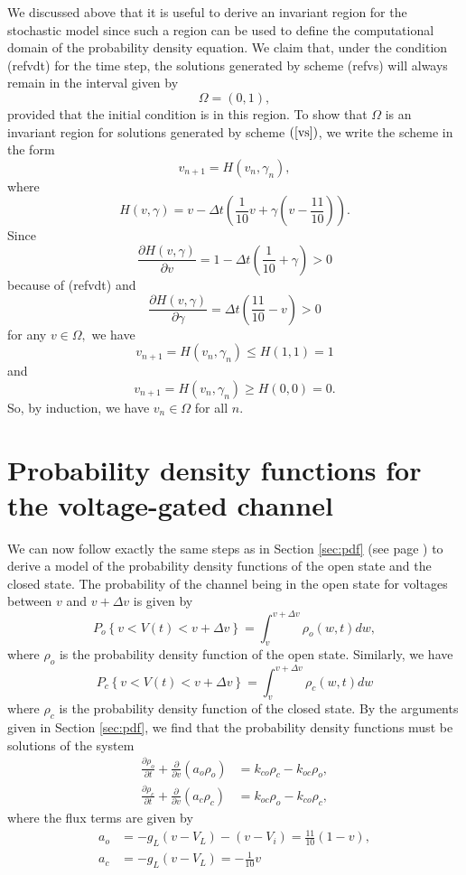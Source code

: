 We discussed above that it is useful to derive an invariant region for the
stochastic model since such a region can be used to define the computational
domain of the probability density equation. We claim that, under the condition
(ref{vdt}) for the time step, the solutions generated by 
scheme (ref{vs}) will always remain in the interval given by
\[
\Omega=(0,1),
\]
provided that the initial condition is in this region. To show that
$\Omega$ is an invariant region for solutions generated by scheme $\left(
\ref{vs}\right)  $, we write the scheme in the form
\[
v_{n+1}=H(v_{n},\gamma_{n}),
\]
where
\[
H(v,\gamma)=v-\Delta t\left(  \frac{1}{10}v+\gamma\left(  v-\frac{11}
{10}\right)  \right)  .
\]
Since
\[
\frac{\partial H(v,\gamma)}{\partial v}=1-\Delta t\left(  \frac{1}{10}
+\gamma\right)  >0
\]
because of (ref{vdt}) and
\[
\frac{\partial H(v,\gamma)}{\partial\gamma}=\Delta t\left(\frac{11}{10}-v\right)>0
\]
for any $v\in\Omega,$ we have
\[
v_{n+1}=H(v_{n},\gamma_{n})\leqslant H\left(  1,1\right)  =1
\]
and
\[
v_{n+1}=H(v_{n},\gamma_{n})\geqslant H(0,0)=0.
\]
So, by induction, we have  $v_{n}\in\Omega$  for all $n$.



\section[Probability density functions]{Probability density functions for the voltage-gated channel}

We can now follow exactly the same steps as in Section \ref{sec:pdf} (see page
\pageref{sec:pdf}) to derive a model of the probability density
functions of the open state and the closed state. The probability of the
channel being in the open state for voltages between $v$ and $v+\Delta v$ is
given by
\[
P_{o}\left\{  v<V(t)<v+\Delta v\right\}  =\int_{v}^{v+\Delta v}\rho_{o}(w,t)dw,
\]
where $\rho_{o}$ is the probability density function of the open state.
Similarly, we have
\[
P_{c}\left\{  v<V(t)<v+\Delta v\right\}  =\int_{v}^{v+\Delta v}\rho_{c}(w,t)dw
\]
where $\rho_{c}$ is the probability density function of the closed state. By
the arguments given in Section \ref{sec:pdf}, we find that the probability
density functions must be solutions of the system
\begin{align}
\frac{\partial\rho_{o}}{\partial t}+\frac{\partial}{\partial v}\left(
a_{o}\rho_{o}\right)   &  =k_{co}\rho_{c}-k_{oc}\rho_{o},\label{vpdf}\\
\frac{\partial\rho_{c}}{\partial t}+\frac{\partial}{\partial v}\left(
a_{c}\rho_{c}\right)   &  =k_{oc}\rho_{o}-k_{co}\rho_{c},\nonumber
\end{align}
where the flux terms are given by
\begin{align}
a_{o} &  =-g_{L}\left(  v-V_{L}\right)  -(v-V_{i})=\frac{11}{10}\left(
1-v\right)  ,\label{vflux}\\
a_{c} &  =-g_{L}\left(  v-V_{L}\right)  =-\frac{1}{10}v\nonumber
\end{align}



